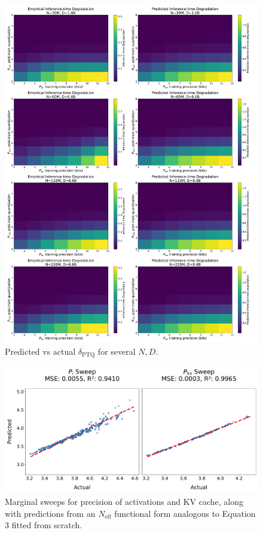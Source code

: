 \documentclass[11pt]{article}
\begin{document}
\begin{figure}
    \centering
    \includegraphics[width=\linewidth]{tax_heatmaps_multiple_N_D_new_evals.pdf}
    \caption{Predicted vs actual $\delta_\text{PTQ}$ for several $N, D$.}
    \label{fig:tax-heatmaps-new-evals}
\end{figure}


\begin{figure}
    \centering
    \includegraphics[width=0.75\linewidth]{appdx_marginals_new_evals.pdf} %
    \caption{Marginal sweeps for precision of activations and KV cache, along with predictions from an $N_\text{eff}$ functional form analogous to Equation 3 fitted from scratch.}
    \label{fig:more-marginals}
\end{figure}
\end{document}
